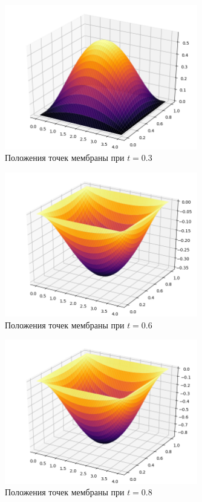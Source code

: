 {{\begin{figure}[H]
    \centering                             
	\includegraphics[width=0.75\textwidth,height=\textheight,keepaspectratio]{3d_33.png}                 
	\centering\caption{ Положения точек мембраны при $t=0.3$}
	\label{grapics6}                           
\end{figure}   
\begin{figure}[H]
    \centering                             
	\includegraphics[width=0.75\textwidth,height=\textheight,keepaspectratio]{3d_66.png}                 
	\centering\caption{ Положения точек мембраны при $t=0.6$}
	\label{grapics7}                           
\end{figure}     
\begin{figure}[H]
    \centering                             
	\includegraphics[width=0.75\textwidth,height=\textheight,keepaspectratio]{3d_8.png}                 
	\centering\caption{ Положения точек мембраны при $t=0.8$}
	\label{grapics8}                           
\end{figure}                          
                             
}}
